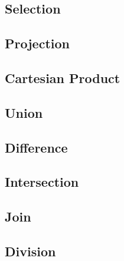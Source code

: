 % 
% 


\subsection{Selection}
\subsection{Projection}
\subsection{Cartesian Product}
\subsection{Union}
\subsection{Difference}
\subsection{Intersection}
\subsection{Join}
\subsection{Division}